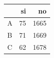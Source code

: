 \begin{tabular}{lrr}
\toprule
 & si & no \\
\midrule
A & 75 & 1665 \\
B & 71 & 1669 \\
C & 62 & 1678 \\
\bottomrule
\end{tabular}
